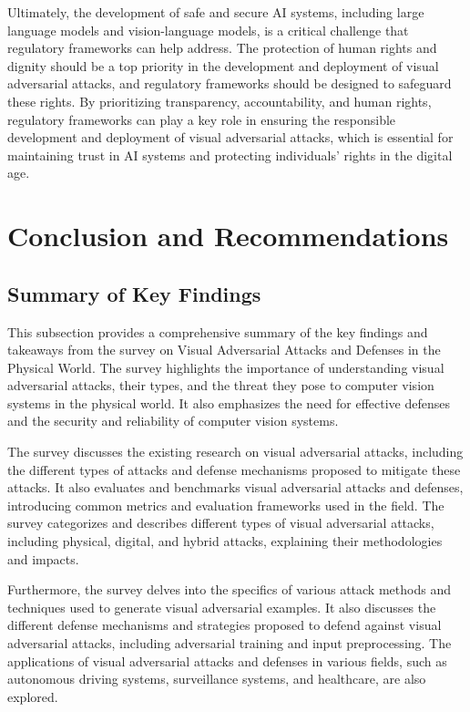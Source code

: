 \documentclass[11pt]{article}
\begin{document}
Ultimately, the development of safe and secure AI systems, including large language models and vision-language models, is a critical challenge that regulatory frameworks can help address. The protection of human rights and dignity should be a top priority in the development and deployment of visual adversarial attacks, and regulatory frameworks should be designed to safeguard these rights. By prioritizing transparency, accountability, and human rights, regulatory frameworks can play a key role in ensuring the responsible development and deployment of visual adversarial attacks, which is essential for maintaining trust in AI systems and protecting individuals' rights in the digital age.

\section{Conclusion and Recommendations}

\subsection{Summary of Key Findings}

This subsection provides a comprehensive summary of the key findings and takeaways from the survey on Visual Adversarial Attacks and Defenses in the Physical World. The survey highlights the importance of understanding visual adversarial attacks, their types, and the threat they pose to computer vision systems in the physical world. It also emphasizes the need for effective defenses and the security and reliability of computer vision systems.

The survey discusses the existing research on visual adversarial attacks, including the different types of attacks and defense mechanisms proposed to mitigate these attacks. It also evaluates and benchmarks visual adversarial attacks and defenses, introducing common metrics and evaluation frameworks used in the field. The survey categorizes and describes different types of visual adversarial attacks, including physical, digital, and hybrid attacks, explaining their methodologies and impacts.

Furthermore, the survey delves into the specifics of various attack methods and techniques used to generate visual adversarial examples. It also discusses the different defense mechanisms and strategies proposed to defend against visual adversarial attacks, including adversarial training and input preprocessing. The applications of visual adversarial attacks and defenses in various fields, such as autonomous driving systems, surveillance systems, and healthcare, are also explored.
\end{document}
